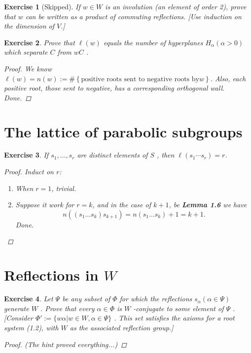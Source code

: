 \documentclass{article}
\theoremstyle{breakstyle}
\newtheorem{exercise}{Exercise}[section]
\begin{document}
\begin{exercise}[Skipped]
If $w \in W$ is an involution (an element of order 2), prove that $w$ can be
written as a product of commuting reflections. [Use induction on the dimension
of $V$.]
\end{exercise}

\begin{exercise}
Prove that $\ell(w)$ equals the number of hyperplanes $H_{\alpha}(\alpha > 0)$
which separate $C$ from $wC$ .

\begin{proof}
    We know $\ell\left( w \right) =n\left( w \right) :=\#\left\{ \text{positive
    roots sent to negative roots by} w\right\} $. Also, each positive root,
    those sent to negative, has a corresponding orthogonal wall. Done.
\end{proof}

\end{exercise}

\section{The lattice of parabolic subgroups}

\begin{exercise}
If $s_1, \ldots, s_r$ are distinct elements of $S$ , then $\ell(s_1 \cdots s_r)
= r$.

\begin{proof}
    Induct on $r$:
    \begin{enumerate}[label=({\roman*})]
        \item 
            When $r=1$, trivial.
        \item 
            Suppose it work for $r=k$, and in the case of $k+1$, be
            \textbf{Lemma 1.6} we have
            $$
            n\left( \left( s_1\ldots s_{k} \right) s_{k+1} \right)
            =n\left( s_1\ldots s_{k} \right) +1
            =k+1
            .$$
            Done.
    \end{enumerate}
\end{proof}

\end{exercise}

\section{Reflections in $W$}

\begin{exercise}
Let $\Psi$ be any subset of $\Phi$ for which the reflections $s_{\alpha}(\alpha
\in \Psi)$ generate $W$ . Prove that every $\alpha \in \Phi$ is $W$ -conjugate
to some element of $\Psi$ . [Consider $\Phi' := \{w\alpha | w \in W, \alpha \in
\Psi\}$ . This set satisfies the axioms for a root system (1.2), with $W$ as the
associated reflection group.]

\begin{proof}
    \emph{(The hint proved everything...)}
\end{proof}

\end{exercise}
\end{document}
